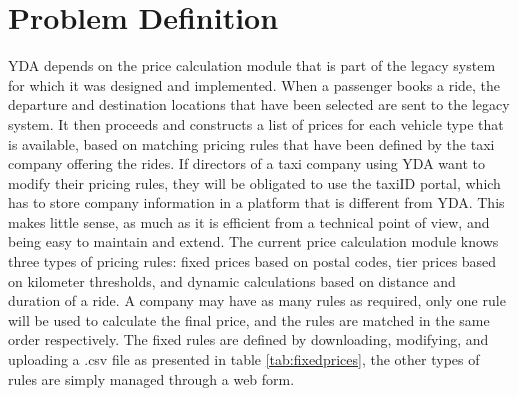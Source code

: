 %
\section{Problem Definition}
YDA depends on the price calculation module that is part of the legacy system for which it was designed and implemented. When a passenger books a ride, the departure and destination locations that have been selected are sent to the legacy system. It then proceeds and constructs a list of prices for each vehicle type that is available, based on matching pricing rules that have been defined by the taxi company offering the rides. If directors of a taxi company using YDA want to modify their pricing rules, they will be obligated to use the taxiID portal, which has to store company information in a platform that is different from YDA. This makes little sense, as much as it is efficient from a technical point of view, and being easy to maintain and extend.
%
%
The current price calculation module knows three types of pricing rules: fixed prices based on postal codes, tier prices based on kilometer thresholds, and dynamic calculations based on distance and duration of a ride. A company may have as many rules as required, only one rule will be used to calculate the final price, and the rules are matched in the same order respectively. The fixed rules are defined by downloading, modifying, and uploading a .csv file as presented in table \ref{tab:fixedprices}, the other types of rules are simply managed through a web form.

